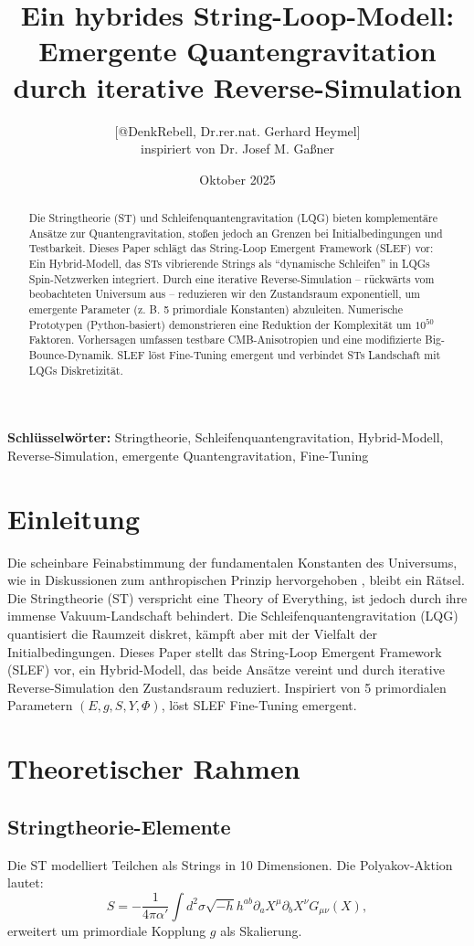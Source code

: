 \documentclass[11pt,a4paper]{article}
\title{Ein hybrides String-Loop-Modell: Emergente Quantengravitation durch iterative Reverse-Simulation}
\author{[@DenkRebell, Dr.rer.nat. Gerhard Heymel] \\ inspiriert von Dr. Josef M. Gaßner}
\date{Oktober 2025}
\begin{document}
	
	\maketitle
	
	\begin{abstract}
		Die Stringtheorie (ST) und Schleifenquantengravitation (LQG) bieten komplementäre Ansätze zur Quantengravitation, stoßen jedoch an Grenzen bei Initialbedingungen und Testbarkeit. Dieses Paper schlägt das String-Loop Emergent Framework (SLEF) vor: Ein Hybrid-Modell, das STs vibrierende Strings als ``dynamische Schleifen'' in LQGs Spin-Netzwerken integriert. Durch eine iterative Reverse-Simulation -- rückwärts vom beobachteten Universum aus -- reduzieren wir den Zustandsraum exponentiell, um emergente Parameter (z. B. 5 primordiale Konstanten) abzuleiten. Numerische Prototypen (Python-basiert) demonstrieren eine Reduktion der Komplexität um $10^{50}$ Faktoren. Vorhersagen umfassen testbare CMB-Anisotropien und eine modifizierte Big-Bounce-Dynamik. SLEF löst Fine-Tuning emergent und verbindet STs Landschaft mit LQGs Diskretizität.
	\end{abstract}
	
	\textbf{Schlüsselwörter:} Stringtheorie, Schleifenquantengravitation, Hybrid-Modell, Reverse-Simulation, emergente Quantengravitation, Fine-Tuning
	
	\section{Einleitung}
	Die scheinbare Feinabstimmung der fundamentalen Konstanten des Universums, wie in Diskussionen zum anthropischen Prinzip hervorgehoben \cite{gassner2024}, bleibt ein Rätsel. Die Stringtheorie (ST) verspricht eine Theory of Everything, ist jedoch durch ihre immense Vakuum-Landschaft behindert. Die Schleifenquantengravitation (LQG) quantisiert die Raumzeit diskret, kämpft aber mit der Vielfalt der Initialbedingungen. Dieses Paper stellt das String-Loop Emergent Framework (SLEF) vor, ein Hybrid-Modell, das beide Ansätze vereint und durch iterative Reverse-Simulation den Zustandsraum reduziert. Inspiriert von 5 primordialen Parametern $(E, g, S, Y, \Phi)$, löst SLEF Fine-Tuning emergent.
	
	\section{Theoretischer Rahmen}
	
	\subsection{Stringtheorie-Elemente}
	Die ST modelliert Teilchen als Strings in 10 Dimensionen. Die Polyakov-Aktion lautet:
	\begin{equation}
		S = -\frac{1}{4\pi\alpha'} \int d^2\sigma \sqrt{-h} h^{ab} \partial_a X^\mu \partial_b X^\nu G_{\mu\nu}(X),
	\end{equation}
	erweitert um primordiale Kopplung $g$ als Skalierung.
	
\end{document}
